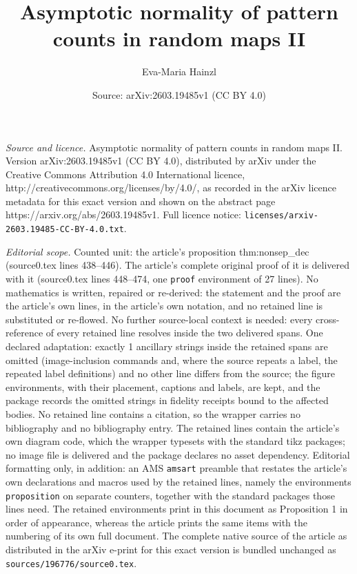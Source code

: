 \documentclass[10pt,a4paper]{amsart}
\title{Asymptotic normality of pattern counts in random maps II}
\author{Eva-Maria Hainzl}
\date{Source: arXiv:2603.19485v1 (CC BY 4.0)}
\begin{document}
\maketitle

\noindent\emph{Source and licence.} Asymptotic normality of pattern counts in random maps II. Version arXiv:2603.19485v1 (CC BY 4.0), distributed by arXiv under the Creative Commons Attribution 4.0 International licence, http://creativecommons.org/licenses/by/4.0/, as recorded in the arXiv licence metadata for this exact version and shown on the abstract page https://arxiv.org/abs/2603.19485v1. Full licence notice: \texttt{licenses/arxiv-2603.19485-CC-BY-4.0.txt}.\par\smallskip

\noindent\textit{Editorial scope.} Counted unit: the article's proposition thm:nonsep\_dec (source0.tex lines 438--446). The article's complete original proof of it is delivered with it (source0.tex lines 448--474, one \texttt{proof} environment of 27 lines). No mathematics is written, repaired or re-derived: the statement and the proof are the article's own lines, in the article's own notation, and no retained line is substituted or re-flowed.  No further source-local context is needed: every cross-reference of every retained line resolves inside the two delivered spans.  One declared adaptation: exactly 1 ancillary strings inside the retained spans are omitted (image-inclusion commands and, where the source repeats a label, the repeated label definitions) and no other line differs from the source; the figure environments, with their placement, captions and labels, are kept, and the package records the omitted strings in fidelity receipts bound to the affected bodies.  No retained line contains a citation, so the wrapper carries no bibliography and no bibliography entry.  The retained lines contain the article's own diagram code, which the wrapper typesets with the standard tikz packages; no image file is delivered and the package declares no asset dependency.  Editorial formatting only, in addition: an AMS \texttt{amsart} preamble that restates the article's own declarations and macros used by the retained lines, namely the environments \texttt{proposition} on separate counters, together with the standard packages those lines need.  The retained environments print in this document as Proposition 1 in order of appearance, whereas the article prints the same items with the numbering of its own full document.  The complete native source of the article as distributed in the arXiv e-print for this exact version is bundled unchanged as \texttt{sources/196776/source0.tex}.
\end{document}
